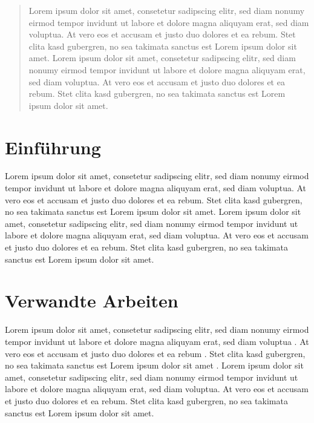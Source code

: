 \begin{abstract}
    Lorem ipsum dolor sit amet, consetetur sadipscing elitr, sed diam nonumy eirmod tempor invidunt ut labore et dolore magna aliquyam erat, sed diam voluptua. At vero eos et accusam et justo duo dolores et ea rebum. Stet clita kasd gubergren, no sea takimata sanctus est Lorem ipsum dolor sit amet. Lorem ipsum dolor sit amet, consetetur sadipscing elitr, sed diam nonumy eirmod tempor invidunt ut labore et dolore magna aliquyam erat, sed diam voluptua. At vero eos et accusam et justo duo dolores et ea rebum. Stet clita kasd gubergren, no sea takimata sanctus est Lorem ipsum dolor sit amet.
\end{abstract}

\section{Einführung}

Lorem ipsum dolor sit amet, consetetur sadipscing elitr, sed diam nonumy eirmod tempor invidunt ut labore et dolore magna aliquyam erat, sed diam voluptua. At vero eos et accusam et justo duo dolores et ea rebum. Stet clita kasd gubergren, no sea takimata sanctus est Lorem ipsum dolor sit amet. Lorem ipsum dolor sit amet, consetetur sadipscing elitr, sed diam nonumy eirmod tempor invidunt ut labore et dolore magna aliquyam erat, sed diam voluptua. At vero eos et accusam et justo duo dolores et ea rebum. Stet clita kasd gubergren, no sea takimata sanctus est Lorem ipsum dolor sit amet.


\section{Verwandte Arbeiten}

Lorem ipsum dolor sit amet, consetetur sadipscing elitr, sed diam nonumy eirmod tempor invidunt ut labore et dolore magna aliquyam erat, sed diam voluptua \cite{ochmann-2014}. At vero eos et accusam et justo duo dolores et ea rebum \cite{ochmann-2014-towards}. Stet clita kasd gubergren, no sea takimata sanctus est Lorem ipsum dolor sit amet \cite{Ochmann-2015-Automatic}. Lorem ipsum dolor sit amet, consetetur sadipscing elitr, sed diam nonumy eirmod tempor invidunt ut labore et dolore magna aliquyam erat, sed diam voluptua. At vero eos et accusam et justo duo dolores et ea rebum. Stet clita kasd gubergren, no sea takimata sanctus est Lorem ipsum dolor sit amet.

